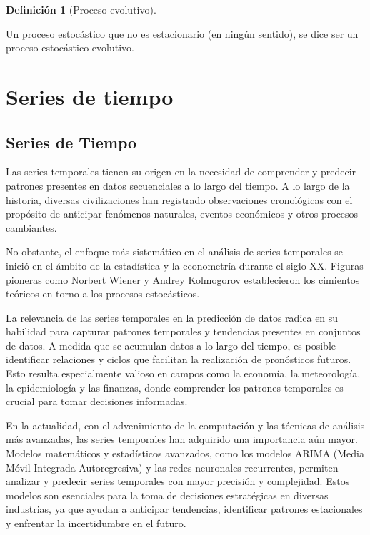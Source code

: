 \documentclass[
  us-letterpaper,
]{scrreprt}
\theoremstyle{plain}
\theoremstyle{definition}
\theoremstyle{plain}
\theoremstyle{definition}
\newtheorem{definition}{Definición}[chapter]
\theoremstyle{remark}
\begin{document}
\begin{definition}[Proceso
evolutivo]\protect\hypertarget{def-EP}{}\label{def-EP}

Un proceso estocástico que no es estacionario (en ningún sentido), se
dice ser un proceso estocástico evolutivo.

\end{definition}

\part{Series de tiempo}

\chapter{Series de Tiempo}\label{series-de-tiempo-1}

Las series temporales tienen su origen en la necesidad de comprender y
predecir patrones presentes en datos secuenciales a lo largo del tiempo.
A lo largo de la historia, diversas civilizaciones han registrado
observaciones cronológicas con el propósito de anticipar fenómenos
naturales, eventos económicos y otros procesos cambiantes.

No obstante, el enfoque más sistemático en el análisis de series
temporales se inició en el ámbito de la estadística y la econometría
durante el siglo XX. Figuras pioneras como Norbert Wiener y Andrey
Kolmogorov establecieron los cimientos teóricos en torno a los procesos
estocásticos.

La relevancia de las series temporales en la predicción de datos radica
en su habilidad para capturar patrones temporales y tendencias presentes
en conjuntos de datos. A medida que se acumulan datos a lo largo del
tiempo, es posible identificar relaciones y ciclos que facilitan la
realización de pronósticos futuros. Esto resulta especialmente valioso
en campos como la economía, la meteorología, la epidemiología y las
finanzas, donde comprender los patrones temporales es crucial para tomar
decisiones informadas.

En la actualidad, con el advenimiento de la computación y las técnicas
de análisis más avanzadas, las series temporales han adquirido una
importancia aún mayor. Modelos matemáticos y estadísticos avanzados,
como los modelos ARIMA (Media Móvil Integrada Autoregresiva) y las redes
neuronales recurrentes, permiten analizar y predecir series temporales
con mayor precisión y complejidad. Estos modelos son esenciales para la
toma de decisiones estratégicas en diversas industrias, ya que ayudan a
anticipar tendencias, identificar patrones estacionales y enfrentar la
incertidumbre en el futuro.
\end{document}
